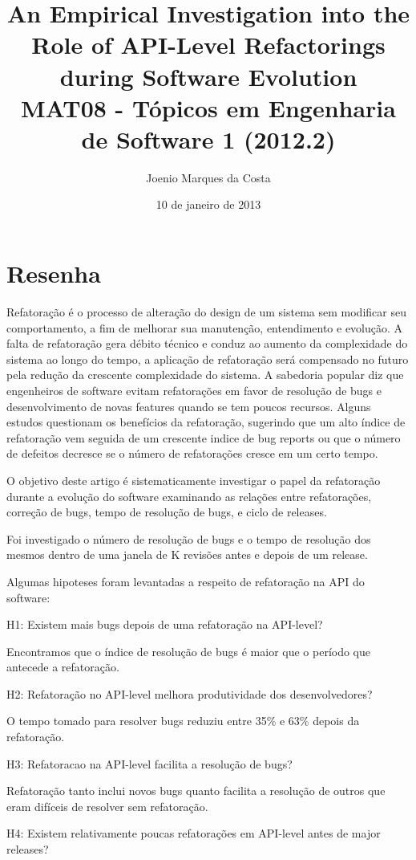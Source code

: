 \documentclass[12pt]{article}
\title{An Empirical Investigation into the Role of API-Level Refactorings
 during Software Evolution\cite{AnEmpiricalInvestigation} \\
 \large MAT08 - Tópicos em Engenharia de Software 1 (2012.2)}
\author{Joenio Marques da Costa}
\date{10 de janeiro de 2013}
\begin{document}
\maketitle

\section*{Resenha}

Refatoração é o processo de alteração do design de um sistema sem modificar seu
comportamento, a fim de melhorar sua manutenção, entendimento e evolução. A
falta de refatoração gera débito técnico e conduz ao aumento da complexidade do
sistema ao longo do tempo, a aplicação de refatoração será compensado no futuro
pela redução da crescente complexidade do sistema. A sabedoria popular diz que
engenheiros de software evitam refatorações em favor de resolução de bugs e
desenvolvimento de novas features quando se tem poucos recursos. Alguns estudos
questionam os benefícios da refatoração, sugerindo que um alto índice de
refatoração vem seguida de um crescente indice de bug reports ou que o número
de defeitos decresce se o número de refatorações cresce em um certo tempo.

O objetivo deste artigo é sistematicamente investigar o papel da refatoração durante a evolução do software examinando as relações entre refatorações, correção de bugs, tempo de resolução de bugs, e ciclo de releases.

Foi investigado o número de resolução de bugs e o tempo de resolução dos mesmos dentro de uma janela de K revisões antes e depois de um release.

Algumas hipoteses foram levantadas a respeito de refatoração na API do software:

H1: Existem mais bugs depois de uma refatoração na API-level?

Encontramos que o índice de resolução de bugs é maior que o período que antecede a refatoração.

H2: Refatoração no API-level melhora produtividade dos desenvolvedores?

O tempo tomado para resolver bugs reduziu entre 35\% e 63\% depois da refatoração.

H3: Refatoracao na API-level facilita a resolução de bugs?

Refatoração tanto inclui novos bugs quanto facilita a resolução de outros que eram difíceis de resolver sem refatoração.

H4: Existem relativamente poucas refatorações em API-level antes de major releases?
\end{document}
